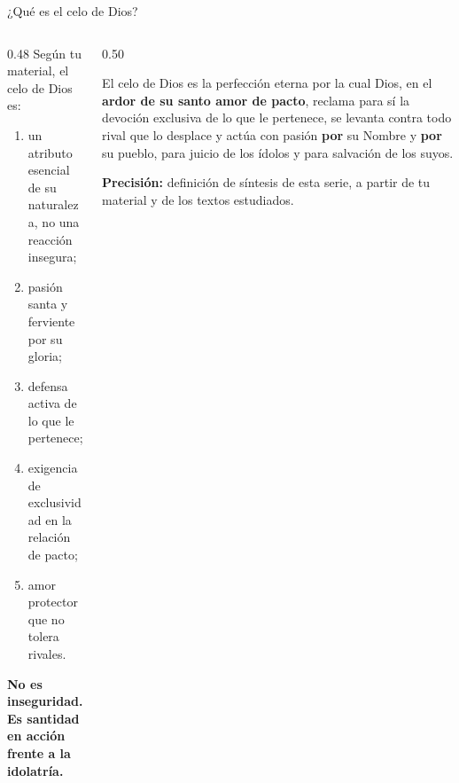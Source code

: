 \documentclass[hyperref={bookmarks=false},aspectratio=169]{beamer}
\newcommand{\destacar}[1]{\textbf{\textcolor{azul}{#1}}}
\newcommand{\precision}[1]{{\footnotesize\color{gris}\textbf{Precisión:} #1}}
\begin{document}
\begin{frame}{¿Qué es el celo de Dios?}
\begin{columns}[c,onlytextwidth]
\begin{column}{0.48\textwidth}\small
Según tu material, el celo de Dios es:
\begin{enumerate}
\item un atributo esencial de su naturaleza, no una reacción insegura;
\item pasión santa y ferviente por su gloria;
\item defensa activa de lo que le pertenece;
\item exigencia de exclusividad en la relación de pacto;
\item amor protector que no tolera rivales.
\end{enumerate}
\begin{center}\destacar{No es inseguridad.}\\ \destacar{Es santidad en acción frente a la idolatría.}\end{center}
\end{column}
\begin{column}{0.50\textwidth}
\begin{tcolorbox}[colback=papiro,colframe=azul,boxrule=1pt,arc=3pt,title={\small Definición},colbacktitle=azul,coltitle=papiro]
\small El celo de Dios es la perfección eterna por la cual Dios, en el \destacar{ardor de su santo amor de pacto}, reclama para sí la devoción exclusiva de lo que le pertenece, se levanta contra todo rival que lo desplace y actúa con pasión \destacar{por} su Nombre y \destacar{por} su pueblo, para juicio de los ídolos y para salvación de los suyos.
\end{tcolorbox}
\precision{definición de síntesis de esta serie, a partir de tu material y de los textos estudiados.}
\end{column}
\end{columns}
\end{frame}
\end{document}
